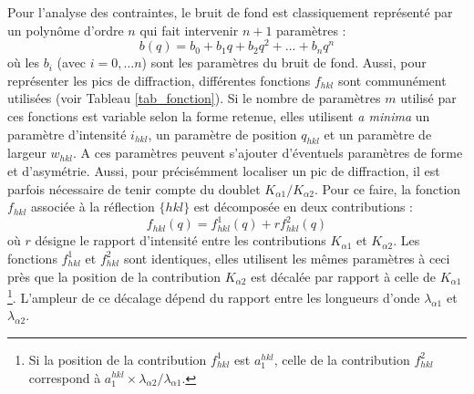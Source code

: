 \documentclass[french,a4paper]{report}
\begin{document}
Pour l'analyse des contraintes, le bruit de fond est classiquement représenté par un polynôme d'ordre $n$ qui fait intervenir $n+1$ paramètres :
\begin{equation}
 b \left(q \right) = b_0 + b_1 q + b_2 q^2 + ...+ b_n q^n
\end{equation}
où les $b_i$ (avec $i=0, ... n$) sont les paramètres du bruit de fond. Aussi, pour représenter les pics de diffraction, différentes fonctions $f_{hkl}$ sont communément utilisées (voir Tableau \ref{tab_fonction}). Si le nombre de paramètres $m$ utilisé par ces fonctions est variable selon la forme retenue, elles utilisent \textit{a minima} un paramètre d'intensité $i_{hkl}$, un paramètre de position $q_{hkl}$ et un paramètre de largeur $w_{hkl}$. A ces paramètres peuvent s'ajouter d'éventuels paramètres de forme et d'asymétrie. Aussi, pour précisémment localiser un pic de diffraction, il est parfois nécessaire de tenir compte du doublet $K_{\alpha 1} / K_{\alpha 2}$. Pour ce faire, la fonction $f_{hkl} $ associée à la réflection $\{ hkl \}$ est décomposée en deux contributions :
\begin{equation}
f_{hkl} \left(q \right) = f^1_{hkl} \left(q \right) + r f^2_{hkl} \left(q \right)
\end{equation}
où $r$ désigne le rapport d'intensité entre les contributions $K_{\alpha 1}$ et $K_{\alpha 2}$. Les fonctions $f^1_{hkl}$ et $f^2_{hkl}$ sont identiques, elles utilisent les mêmes paramètres à ceci près que la position de la contribution $K_{\alpha 2}$ est décalée par rapport à celle de  $K_{\alpha 1}$\footnote{Si la position de la contribution $f^1_{hkl}$ est $a_1^{hkl}$, celle de la contribution $f^2_{hkl}$ correspond à $a_1^{hkl}\times \lambda_{\alpha 2} / \lambda_{\alpha 1}$.}. L'ampleur de ce décalage dépend du rapport entre les longueurs d'onde $\lambda_{\alpha 1}$ et  $\lambda_{\alpha 2}$.
\end{document}
